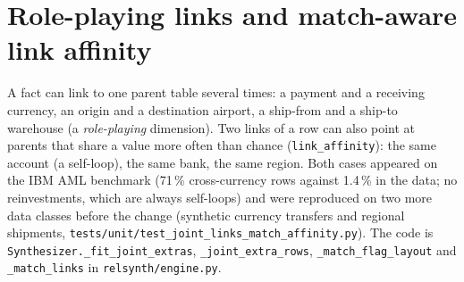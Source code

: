\section{Role-playing links and match-aware link affinity}\label{sec:v75rolelinks}
\setcounter{savedproprole}{\value{proposition}}
A fact can link to one parent table several times: a payment and a receiving currency, an origin and a destination airport, a ship-from and a ship-to warehouse (a \emph{role-playing} dimension). Two links of a row can also point at parents that share a value more often than chance (\texttt{link\_affinity}): the same account (a self-loop), the same bank, the same region. Both cases appeared on the IBM AML benchmark (71\,\% cross-currency rows against 1.4\,\% in the data; no reinvestments, which are always self-loops) and were reproduced on two more data classes before the change (synthetic currency transfers and regional shipments, \texttt{tests/unit/test\_joint\_links\_match\_affinity.py}). The code is \texttt{Synthesizer.\_fit\_joint\_extras}, \texttt{\_joint\_extra\_rows}, \texttt{\_match\_flag\_layout} and \texttt{\_match\_links} in \texttt{relsynth/engine.py}.

